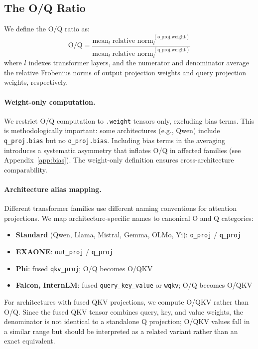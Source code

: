 \documentclass[11pt]{article}
\newcommand{\oq}{\text{O/Q}}
\begin{document}
\subsection{The O/Q Ratio}
\label{sec:oq-def}

We define the O/Q ratio as:
\begin{equation}
  \oq = \frac{\text{mean}_{l} \; \text{relative norm}_{l}^{(\text{o\_proj.weight})}}{\text{mean}_{l} \; \text{relative norm}_{l}^{(\text{q\_proj.weight})}}
  \label{eq:oq}
\end{equation}
where $l$ indexes transformer layers, and the numerator and denominator average
the relative Frobenius norms of output projection weights and query projection
weights, respectively.

\paragraph{Weight-only computation.}
We restrict O/Q computation to \texttt{.weight} tensors only, excluding bias
terms.
This is methodologically important: some architectures (e.g., Qwen) include
\texttt{q\_proj.bias} but no \texttt{o\_proj.bias}.
Including bias terms in the averaging introduces a systematic asymmetry that
inflates O/Q in affected families (see Appendix~\ref{app:bias}).
The weight-only definition ensures cross-architecture comparability.

\paragraph{Architecture alias mapping.}
Different transformer families use different naming conventions for attention
projections.
We map architecture-specific names to canonical O and Q categories:
\begin{itemize}[nosep]
  \item \textbf{Standard} (Qwen, Llama, Mistral, Gemma, OLMo, Yi):
    \texttt{o\_proj} / \texttt{q\_proj}
  \item \textbf{EXAONE}: \texttt{out\_proj} / \texttt{q\_proj}
  \item \textbf{Phi}: fused \texttt{qkv\_proj}; O/Q becomes O/QKV
  \item \textbf{Falcon, InternLM}: fused \texttt{query\_key\_value} or
    \texttt{wqkv}; O/Q becomes O/QKV
\end{itemize}
For architectures with fused QKV projections, we compute O/QKV rather than O/Q.
Since the fused QKV tensor combines query, key, and value weights, the
denominator is not identical to a standalone Q projection; O/QKV values fall in
a similar range but should be interpreted as a related variant rather than an
exact equivalent.
\end{document}
